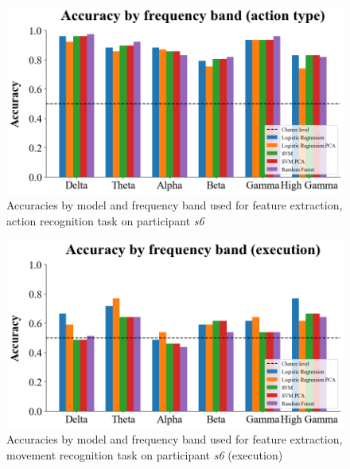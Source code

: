 \documentclass[10pt,conference,compsocconf]{IEEEtran}
\begin{document}
\begin{figure}[h!]
    \center
    \includegraphics[width=\linewidth]{../Code/figures/s6_accuracies_ExObs_freq_bands.png}
    \caption{Accuracies by model and frequency band used for feature extraction, action recognition task on participant \textit{s6}}
    \label{appfig:accuracies_ExObs_freq_bands}
\end{figure}
\FloatBarrier

\begin{figure}[h!]
    \center
    \includegraphics[width=\linewidth]{../Code/figures/s6_accuracies_ex_freq_bands.png}
    \caption{Accuracies by model and frequency band used for feature extraction, movement recognition task on participant \textit{s6} (execution)}
    \label{appfig:accuracies_ex_freq_bands}
\end{figure}
\FloatBarrier
\end{document}
